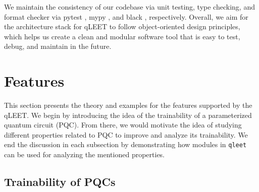 \documentclass[%
 reprint,
 amsmath,
 amssymb,
 showkeys,
 pra,
 floatfix,
]{revtex4-2}
\begin{document}
We maintain the consistency of our codebase via unit testing, type checking, and format checker via pytest \cite{pytestx.y}, mypy \cite{mypy}, and black \cite{black}, respectively. Overall, we aim for the architecture stack for qLEET to follow object-oriented design principles, which helps us create a clean and modular software tool that is easy to test, debug, and maintain in the future. 



\section{\label{sec:features}Features}

This section presents the theory and examples for the features supported by the qLEET. We begin by introducing the idea of the trainability of a parameterized quantum circuit (PQC). From there, we would motivate the idea of studying different properties related to PQC to improve and analyze its trainability. We end the discussion in each subsection by demonstrating how modules in \texttt{qleet} can be used for analyzing the mentioned properties. 

\subsection{\label{sec:training}Trainability of PQCs}
\end{document}
